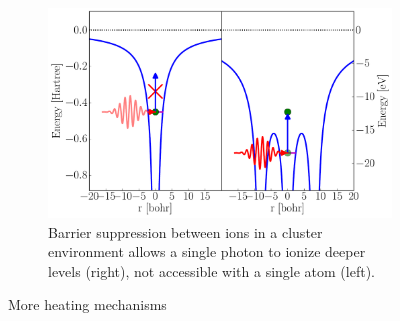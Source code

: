 \begin{figure}
    \begin{subfigure}{\figurewidth}
        \centering
        \includegraphics[width=\textwidth]{figures/heating_barrier_sup}
        \caption{Barrier suppression between ions in a cluster environment allows
                 a single photon to ionize deeper levels (right), not accessible
                 with a single atom (left).}
        \label{fig:heating:barrier}
    \end{subfigure}
 \caption{More heating mechanisms}
 \label{fig:heating}
\end{figure}

